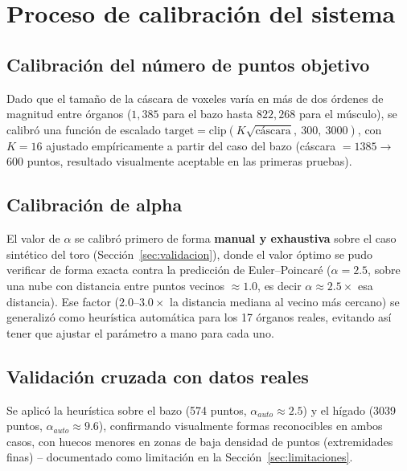 \documentclass[12pt,a4paper]{article}
\begin{document}
\section{Proceso de calibración del sistema}

\subsection{Calibración del número de puntos objetivo}

Dado que el tamaño de la cáscara de voxeles varía en más de dos órdenes
de magnitud entre órganos ($1{,}385$ para el bazo hasta $822{,}268$
para el músculo), se calibró una función de escalado
$\text{target} = \text{clip}(K\sqrt{\text{cáscara}},\ 300,\ 3000)$, con
$K=16$ ajustado empíricamente a partir del caso del bazo (cáscara
$=1385 \rightarrow$ 600 puntos, resultado visualmente aceptable en las
primeras pruebas).

\subsection{Calibración de alpha}

El valor de $\alpha$ se calibró primero de forma \textbf{manual y
exhaustiva} sobre el caso sintético del toro (Sección~\ref{sec:validacion}),
donde el valor óptimo se pudo verificar de forma exacta contra la
predicción de Euler--Poincaré ($\alpha = 2.5$, sobre una nube con
distancia entre puntos vecinos $\approx 1.0$, es decir $\alpha \approx
2.5\times$ esa distancia). Ese factor ($2.0$--$3.0\times$ la distancia
mediana al vecino más cercano) se generalizó como heurística automática
para los 17 órganos reales, evitando así tener que ajustar el parámetro
a mano para cada uno.

\subsection{Validación cruzada con datos reales}

Se aplicó la heurística sobre el bazo (574 puntos, $\alpha_{auto}
\approx 2.5$) y el hígado (3039 puntos, $\alpha_{auto} \approx 9.6$),
confirmando visualmente formas reconocibles en ambos casos, con huecos
menores en zonas de baja densidad de puntos (extremidades finas) --
documentado como limitación en la Sección~\ref{sec:limitaciones}.

\end{document}
